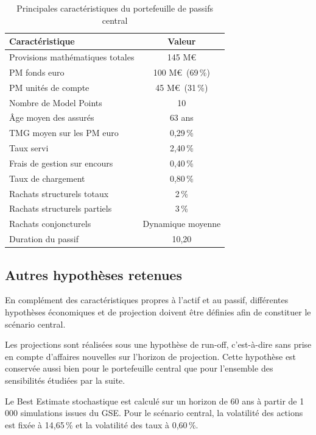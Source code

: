 \begin{table}[H]
    \centering
    \caption{Principales caractéristiques du portefeuille de passifs central}
    \label{tab:caracteristiques_passif_central}
    \begin{tabular}{lc}
        \hline
        \textbf{Caractéristique} & \textbf{Valeur} \\
        \hline
        Provisions mathématiques totales & 145 M\euro \\
        PM fonds euro & 100 M\euro \ (69\,\%) \\
        PM unités de compte & 45 M\euro \ (31\,\%) \\
        Nombre de Model Points & 10 \\
        Âge moyen des assurés & 63 ans \\
        TMG moyen sur les PM euro & 0,29\,\% \\
        Taux servi & 2,40\,\% \\
        Frais de gestion sur encours & 0,40\,\% \\
        Taux de chargement & 0,80\,\% \\
        Rachats structurels totaux & 2\,\% \\
        Rachats structurels partiels & 3\,\% \\
        Rachats conjoncturels & Dynamique moyenne \\
        Duration du passif & 10,20 \\
        \hline
    \end{tabular}
\end{table}


\subsection{Autres hypothèses retenues}

En complément des caractéristiques propres à l'actif et au passif, différentes hypothèses économiques et de projection doivent être définies afin de constituer le scénario central.

Les projections sont réalisées sous une hypothèse de run-off, c'est-à-dire sans prise en compte d'affaires nouvelles sur l'horizon de projection. Cette hypothèse est conservée aussi bien pour le portefeuille central que pour l'ensemble des sensibilités étudiées par la suite.

Le Best Estimate stochastique est calculé sur un horizon de 60 ans à partir de 1\,000 simulations issues du GSE. Pour le scénario central, la volatilité des actions est fixée à 14,65\,\% et la volatilité des taux à 0,60\,\%.

